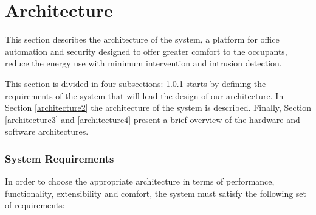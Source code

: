 \chapter{Architecture}
\label{chapter:architecture}

This section describes the architecture of the system, a platform for office automation and security designed to offer greater comfort to the occupants, reduce the energy use with minimum intervention and intrusion detection.

This section is divided in four subsections: \ref{architecture1} starts by defining the requirements of the system that will lead the design of our architecture. In Section \ref{architecture2} the architecture of the system is described. Finally, Section \ref{architecture3} and \ref{architecture4} present a brief overview of the hardware and software architectures.




\subsection{System Requirements}\label{architecture1} 

In order to choose the appropriate architecture in terms of performance, functionality, extensibility and comfort, the system must satisfy the following set of requirements:

